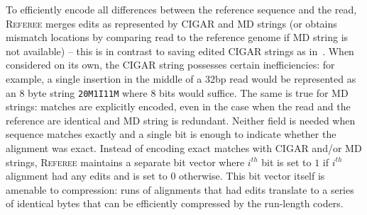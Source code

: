 \documentclass[12pt]{cmuthesis}
\newcommand{\refer}{\textsc{Referee}\xspace}
\begin{document}


  To efficiently encode all differences between the reference sequence and the read, \refer merges edits as represented by CIGAR and MD strings (or obtains mismatch locations by comparing read to the reference genome if MD string is not available) -- this is in contrast to saving edited CIGAR strings as in~\cite{Sahinalp2015}.  When considered on its own, the CIGAR string possesses certain inefficiencies: for example, a single insertion in the middle of a 32bp read would be represented as an 8 byte string \texttt{20M1I11M} where 8 bits would suffice. The same is true for MD strings: matches are explicitly encoded, even in the case when the read and the reference are identical and MD string is redundant. Neither field is needed when sequence matches exactly and a single bit is enough to indicate whether the alignment was exact. Instead of encoding exact matches with CIGAR and/or MD strings, \refer maintains a separate bit vector where $i^{th}$ bit is set to $1$ if $i^{th}$ alignment had any edits and is set to $0$ otherwise. This bit vector itself is amenable to compression: runs of alignments that had edits translate to a series of identical bytes that can be efficiently compressed by the run-length coders.
\end{document}
